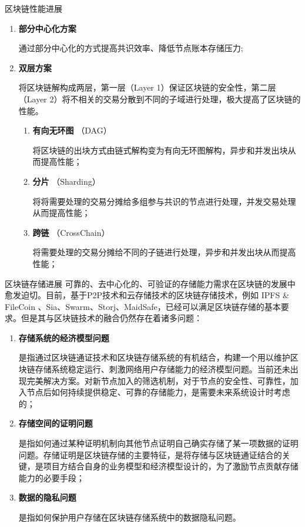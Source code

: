 \documentclass[11pt]{beamer}
\begin{document}
\begin{frame}{区块链性能进展}
	\begin{enumerate}
		\item \textbf{部分中心化方案}

		      {\scriptsize 通过部分中心化的方式提高共识效率、降低节点账本存储压力;}

		\item \textbf{双层方案}

		      {\scriptsize 	将区块链解构成两层，第一层（Layer 1）保证区块链的安全性，第二层（Layer 2）将不相关的交易分散到不同的子域进行处理，极大提高了区块链的性能。}
		      \begin{enumerate}
			      \item  \textbf{有向无环图} （DAG）

			            {\scriptsize 将区块链的出块方式由链式解构变为有向无环图解构，异步和并发出块从而提高性能；}
			      \item  \textbf{分片} （Sharding）

			            {\scriptsize 将将需要处理的交易分摊给多组参与共识的节点进行处理，并发交易处理从而提高性能；}

			      \item  \textbf{跨链} （CrossChain）

			            {\scriptsize 将需要处理的交易分摊给不同的子链进行处理，异步和并发出块从而提高性能；}
		      \end{enumerate}
	\end{enumerate}
\end{frame}

\begin{frame}{区块链存储进展}
	可靠的、去中心化的、可验证的存储能力需求在区块链的发展中愈发迫切。目前，基于P2P技术和云存储技术的区块链存储技术，例如 IPFS \& FileCoin 、Sia、Swarm、Storj、MaidSafe，已经可以满足区块链存储的基本要求。但是其与区块链技术的融合仍然存在着诸多问题：

	\begin{enumerate}
		\item \textbf{存储系统的经济模型问题}

		      {\scriptsize  是指通过区块链通证技术和区块链存储系统的有机结合，构建一个用以维护区块链存储系统稳定运行、刺激网络用户存储能力的经济模型问题。当前还未出现完美解决方案。对新节点加入的筛选机制，对于节点的安全性、可靠性，加入节点后如何持续提供稳定、可靠的存储能力，是需要未来系统设计时考虑的；}
		\item \textbf{存储空间的证明问题}

		      {\scriptsize  是指如何通过某种证明机制向其他节点证明自己确实存储了某一项数据的证明问题。存储证明是区块链存储的主要特征，是将存储与区块链通证结合的关键，是项目方结合自身的业务模型和经济模型设计的，为了激励节点贡献存储能力的必要手段；}
		\item \textbf{数据的隐私问题}

		      {\scriptsize  是指如何保护用户存储在区块链存储系统中的数据隐私问题。}
	\end{enumerate}
\end{frame}
\end{document}
